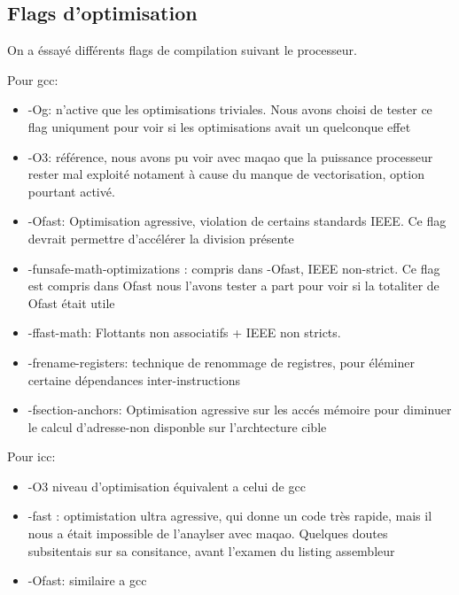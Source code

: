 \documentclass{report}
\begin{document}
\subsection*{Flags d'optimisation}

On a éssayé différents flags de compilation suivant le processeur.

Pour gcc:
\begin{itemize}
    \item{-Og: n'active que les optimisations triviales. Nous avons choisi de tester ce flag uniqument pour voir si les optimisations avait un quelconque effet}
    \item{-O3: référence, nous avons pu voir avec maqao que la puissance processeur rester mal exploité notament à cause du manque de vectorisation, option pourtant activé.}
    \item{-Ofast: Optimisation agressive, violation de certains standards IEEE. Ce flag devrait permettre d'accélérer la division présente }
    \item{-funsafe-math-optimizations : compris dans -Ofast, IEEE non-strict. Ce flag est compris dans Ofast nous l'avons tester a part pour voir si la totaliter de Ofast était utile }
    \item{-ffast-math: Flottants non associatifs + IEEE non stricts.}
    \item{-frename-registers: technique de renommage de registres, pour éléminer certaine dépendances inter-instructions}
    \item{-fsection-anchors: Optimisation agressive sur les accés mémoire pour diminuer le calcul d'adresse-non disponble sur l'archtecture cible}
\end{itemize}

Pour icc:
\begin{itemize}
    \item{-O3 niveau d'optimisation équivalent a celui de gcc}
    \item{-fast : optimistation ultra agressive, qui donne un code très rapide, mais il nous a était impossible de l'anaylser avec maqao. Quelques doutes subsitentais sur sa consitance, avant l'examen du listing assembleur}
    \item {-Ofast: similaire a gcc}
\end{itemize}
\end{document}

